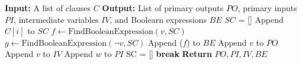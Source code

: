 \begin{algorithmic}[1]
    \STATE \textbf{Input:} A list of clauses $C$
    \STATE \textbf{Output:} List of primary outputs $PO$, primary inputs $PI$, intermediate variables $IV$, and Boolearn expressions $BE$
    \STATE $SC$ = [] 
            \STATE Append $C[i]$ to $SC$
                    \STATE $f \gets \text{FindBooleanExpression}(v, SC)$ %
                    \STATE $g \gets \text{FindBooleanExpression}(\neg v, SC)$ %
                        \STATE Append ($f$) to $BE$ %
                            \STATE Append $v$ to $PO$
                        \ELSE
                            \STATE Append $v$ to $IV$
                        \ENDIF
                                \STATE Append $w$ to $PI$
                            \ENDIF
                        \ENDFOR
                        \STATE SC = []
                        \STATE \textbf{break}
                    \ENDIF
                \ENDIF    
            \ENDFOR
    \ENDFOR
    \STATE \textbf{Return} $PO, PI, IV, BE$
    \vspace{-0.65cm}
\end{algorithmic}
